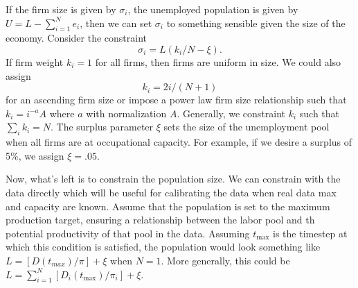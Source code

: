 If the firm size is given by $\sigma_i$, the unemployed population is given by $U=L-\sum_{i=1}^Ne_i$, then we can set $\sigma_i$ to something sensible given the size of the economy. Consider the constraint
\begin{equation}
    \sigma_i=L(k_i/N-\xi).
\end{equation}
If firm weight $k_i=1$ for all firms, then firms are uniform in size. We could also assign 
\begin{equation}
    k_i=2i/(N+1)
\end{equation} for an ascending firm size or impose a power law firm size relationship such that $k_i=i^{-a}A$ where $a$ with normalization $A$. Generally, we constraint $k_i$ such that $\sum_ik_i=N$. The surplus parameter $\xi$ sets the size of the unemployment pool when all firms are at occupational capacity. For example, if we desire a surplus of 5\%, we assign $\xi=.05$. 

Now, what's left is to constrain the population size. 
We can constrain with the data directly which will be useful for calibrating the data when real data max and capacity are known. 
Assume that the population is set to the maximum production target, ensuring a relationship between the labor pool and th potential productivity of that pool in the data.  Assuming $t_\textrm{max}$ is the timestep at which this condition is satisfied, the population would look something like $L=[D(t_{max})/\pi]+\xi$ when $N=1$. More generally, this could be $L=\sum_{i=1}^N[D_i(t_{\textrm{max}})/\pi_i]+\xi$.
